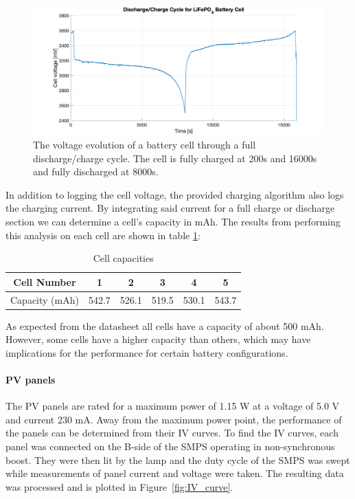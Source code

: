 \documentclass[a4paper]{article}
\begin{document}
\begin{figure}[H]
    \centering
    \includegraphics[scale=0.22]{Charge_Cycle2.png}
    \caption{The voltage evolution of a battery cell through a full discharge/charge cycle. The
    cell is fully charged at 200s and 16000s and fully discharged at 8000s.}
    \label{fig:charge_cycle}
\end{figure}

In addition to logging the cell voltage, the provided charging algorithm also 
logs the charging current. By integrating said current for a full charge or 
discharge section we can determine a cell's capacity in mAh. The results from 
performing this analysis on each cell are shown in table \ref{table:1}:

\vspace{5pt}
\begin{table}[h!]
    \centering
    \begin{tabular}{||c| c c c c c||} 
        \hline
        Cell Number& 1 & 2 & 3 & 4 & 5 \\ [0.5ex] 
        \hline
        Capacity (mAh) & 542.7	& 526.1	& 519.5	& 530.1	& 543.7\\ [1ex] 
        \hline
    \end{tabular}
    \caption{Cell capacities}
    \label{table:1}
\end{table}

As expected from the datasheet\cite{batteryDatasheet} all cells have a capacity of about 500 mAh. However, some cells 
have a higher capacity than others, which may have implications for the 
performance for certain battery configurations.

\paragraph*{PV panels}
\vspace{-6pt}
The PV panels are rated for a maximum power of 1.15 W at a voltage of 
5.0 V and current 230 mA. Away from the maximum power point, the performance 
of the panels can be determined from their IV curves. To find the IV 
curves, each panel was connected on the B-side of the SMPS operating 
in non-synchronous boost. They were then lit by the lamp and the duty 
cycle of the SMPS was swept while measurements of panel current and 
voltage were taken. The resulting data was processed and is plotted 
in Figure~\ref{fig:IV_curve}.
\end{document}

